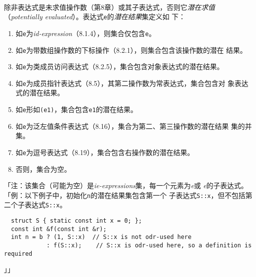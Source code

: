 \paragraph{}
除非表达式是未求值操作数（第8章）或其子表达式，否则它\textit{潜在求值}
（\textit{potentially evaluated}）。表达式\texttt{e}的\textit{潜在结果}集定义如
下：
\begin{enumerate}
  \item{如\texttt{e}为\textit{id-expression}（8.1.4），则集合仅包含\texttt{e}。}
  \item{如\texttt{e}为带数组操作数的下标操作（8.2.1），则集合包含该操作数的潜在
    结果。}
  \item{如\texttt{e}为类成员访问表达式（8.2.5），集合包含对象表达式的潜在结果。}
  \item{如\texttt{e}为成员指针表达式（8.5），其第二操作数为常表达式，集合包含对
    象表达式的潜在结果。}
  \item{如\texttt{e}形如\texttt{(e1)}，集合包含\texttt{e1}的潜在结果。}
  \item{如\texttt{e}为泛左值条件表达式（8.16），集合为第二、第三操作数的潜在结果
    集的并集。}
  \item{如\texttt{e}为逗号表达式（8.19），集合包含右操作数的潜在结果。}
  \item{否则，集合为空。}
\end{enumerate}
「注：该集合（可能为空）是\textit{ie-expressions}集，每一个元素为\textit{e}或
\textit{e}的子表达式。「例：以下例子中，初始化\texttt{n}的潜在结果集包含第一个
子表达式\texttt{S::x}，但不包括第二个子表达式\texttt{S::x}。
\begin{lstlisting}
  struct S { static const int x = 0; };
  const int &f(const int &r);
  int n = b ? (1, S::x)  // S::x is not odr-used here
            : f(S::x);    // S::x is odr-used here, so a definition is required
\end{lstlisting}」」

